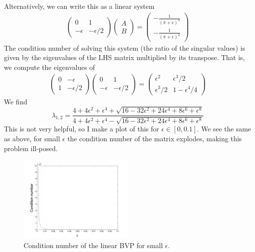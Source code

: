 \documentclass[11pt]{article}
\def\f{\frac }
\begin{document}
\begin{enumerate}
Alternatively, we can write this as a linear system
\begin{align*}\left ( \begin{array}{cc} 0 & 1 \\ -\epsilon & -\epsilon /2 \end{array} \right ) \left ( \begin{array}{c} A \\ B \end{array} \right ) = \left ( \begin{array}{c} -\f{1}{(\pi+\epsilon)^2} \\ -\f{1}{(\pi+\epsilon)^2} \end{array} \right ) \end{align*}
The condition number of solving this system (the ratio of the singular values) is given by the eigenvalues of the LHS matrix multiplied by its transpose.
That is, we compute the eigenvalues of 
\begin{align*}\left ( \begin{array}{cc} 0 & -\epsilon  \\ 1 & -\epsilon /2 \end{array} \right )\left ( \begin{array}{cc} 0 & 1 \\ -\epsilon & -\epsilon /2 \end{array} \right ) = \left ( \begin{array}{cc} \epsilon ^2  & \epsilon ^3 /2 \\ \epsilon^3 /2 & 1  -\epsilon^4 /4 \end{array} \right ) \end{align*}
We find
\[ \lambda _{1,2} = \f{4+4\epsilon^2+\epsilon^4+\sqrt{16-32\epsilon^2+24\epsilon^4+8\epsilon^6+\epsilon^8}}{4+4\epsilon^2+\epsilon^4-\sqrt{16-32\epsilon^2+24\epsilon^4+8\epsilon^6+\epsilon^8}} \]
This is not very helpful, so I make a plot of this for $\epsilon \in [0,0.1]$.
We see the same as above, for small $\epsilon$ the condition number of the matrix explodes, making this problem ill-posed.

\begin{figure}[h!]
  \centering
    \includegraphics[width=0.5\textwidth]{andy_hw06_prb2_01.png}
  \caption{Condition number of the linear BVP for small $\epsilon$.}
\end{figure}



\end{enumerate}


\end{document}
